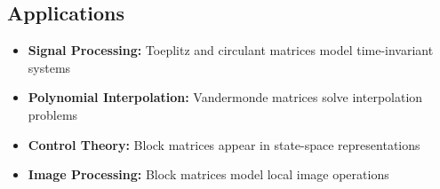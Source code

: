 \subsection{Applications}
\begin{itemize}
    \item \textbf{Signal Processing:} 
          Toeplitz and circulant matrices model time-invariant systems
    \item \textbf{Polynomial Interpolation:} 
          Vandermonde matrices solve interpolation problems
    \item \textbf{Control Theory:} 
          Block matrices appear in state-space representations
    \item \textbf{Image Processing:} 
          Block matrices model local image operations
\end{itemize} 